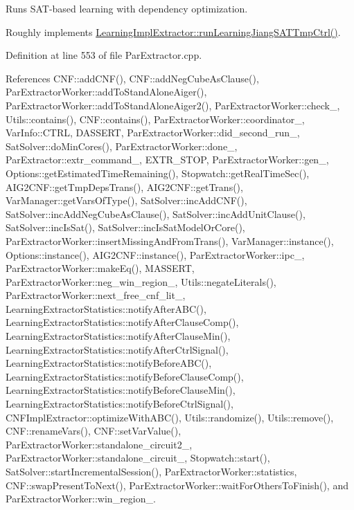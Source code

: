 Runs S\-A\-T-\/based learning with dependency optimization. 

Roughly implements \hyperlink{classLearningImplExtractor_ad41484b6bb6da18e50d31830a18e63e9}{Learning\-Impl\-Extractor\-::run\-Learning\-Jiang\-S\-A\-T\-Tmp\-Ctrl()}. 

Definition at line 553 of file Par\-Extractor.\-cpp.



References C\-N\-F\-::add\-C\-N\-F(), C\-N\-F\-::add\-Neg\-Cube\-As\-Clause(), Par\-Extractor\-Worker\-::add\-To\-Stand\-Alone\-Aiger(), Par\-Extractor\-Worker\-::add\-To\-Stand\-Alone\-Aiger2(), Par\-Extractor\-Worker\-::check\-\_\-, Utils\-::contains(), C\-N\-F\-::contains(), Par\-Extractor\-Worker\-::coordinator\-\_\-, Var\-Info\-::\-C\-T\-R\-L, D\-A\-S\-S\-E\-R\-T, Par\-Extractor\-Worker\-::did\-\_\-second\-\_\-run\-\_\-, Sat\-Solver\-::do\-Min\-Cores(), Par\-Extractor\-Worker\-::done\-\_\-, Par\-Extractor\-::extr\-\_\-command\-\_\-, E\-X\-T\-R\-\_\-\-S\-T\-O\-P, Par\-Extractor\-Worker\-::gen\-\_\-, Options\-::get\-Estimated\-Time\-Remaining(), Stopwatch\-::get\-Real\-Time\-Sec(), A\-I\-G2\-C\-N\-F\-::get\-Tmp\-Deps\-Trans(), A\-I\-G2\-C\-N\-F\-::get\-Trans(), Var\-Manager\-::get\-Vars\-Of\-Type(), Sat\-Solver\-::inc\-Add\-C\-N\-F(), Sat\-Solver\-::inc\-Add\-Neg\-Cube\-As\-Clause(), Sat\-Solver\-::inc\-Add\-Unit\-Clause(), Sat\-Solver\-::inc\-Is\-Sat(), Sat\-Solver\-::inc\-Is\-Sat\-Model\-Or\-Core(), Par\-Extractor\-Worker\-::insert\-Missing\-And\-From\-Trans(), Var\-Manager\-::instance(), Options\-::instance(), A\-I\-G2\-C\-N\-F\-::instance(), Par\-Extractor\-Worker\-::ipc\-\_\-, Par\-Extractor\-Worker\-::make\-Eq(), M\-A\-S\-S\-E\-R\-T, Par\-Extractor\-Worker\-::neg\-\_\-win\-\_\-region\-\_\-, Utils\-::negate\-Literals(), Par\-Extractor\-Worker\-::next\-\_\-free\-\_\-cnf\-\_\-lit\-\_\-, Learning\-Extractor\-Statistics\-::notify\-After\-A\-B\-C(), Learning\-Extractor\-Statistics\-::notify\-After\-Clause\-Comp(), Learning\-Extractor\-Statistics\-::notify\-After\-Clause\-Min(), Learning\-Extractor\-Statistics\-::notify\-After\-Ctrl\-Signal(), Learning\-Extractor\-Statistics\-::notify\-Before\-A\-B\-C(), Learning\-Extractor\-Statistics\-::notify\-Before\-Clause\-Comp(), Learning\-Extractor\-Statistics\-::notify\-Before\-Clause\-Min(), Learning\-Extractor\-Statistics\-::notify\-Before\-Ctrl\-Signal(), C\-N\-F\-Impl\-Extractor\-::optimize\-With\-A\-B\-C(), Utils\-::randomize(), Utils\-::remove(), C\-N\-F\-::rename\-Vars(), C\-N\-F\-::set\-Var\-Value(), Par\-Extractor\-Worker\-::standalone\-\_\-circuit2\-\_\-, Par\-Extractor\-Worker\-::standalone\-\_\-circuit\-\_\-, Stopwatch\-::start(), Sat\-Solver\-::start\-Incremental\-Session(), Par\-Extractor\-Worker\-::statistics, C\-N\-F\-::swap\-Present\-To\-Next(), Par\-Extractor\-Worker\-::wait\-For\-Others\-To\-Finish(), and Par\-Extractor\-Worker\-::win\-\_\-region\-\_\-.

